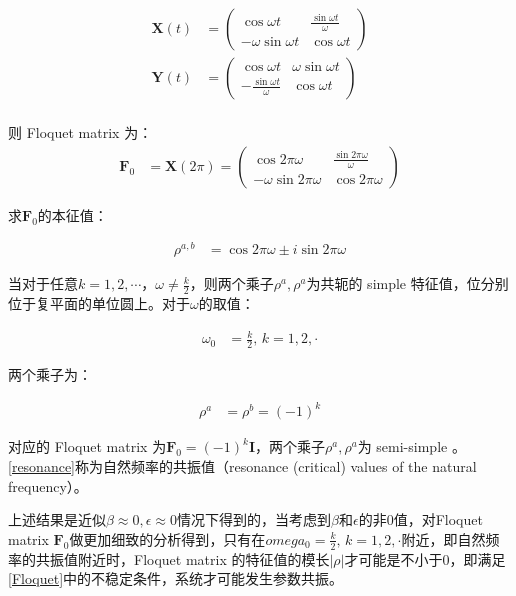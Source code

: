 \begin{align}
    \mathbf{X}(t) &= 
    \begin{pmatrix}
        \cos\omega t & \frac{\sin\omega t}{\omega} \\ 
        -\omega\sin\omega t & \cos\omega t
    \end{pmatrix} \\
    \mathbf{Y}(t) &= 
    \begin{pmatrix}
        \cos\omega t & \omega\sin\omega t \\ 
        -\frac{\sin\omega t}{\omega} & \cos\omega t
    \end{pmatrix} \\
\end{align}

则 Floquet matrix 为：
\begin{align}
    \mathbf{F}_{0} &= \mathbf{X}(2\pi) =
    \begin{pmatrix}
        \cos2\pi\omega & \frac{\sin2\pi\omega}{\omega} \\ 
        -\omega\sin2\pi\omega & \cos2\pi\omega
    \end{pmatrix}
\end{align}

求$\mathbf{F}_{0}$的本征值：

\begin{align}
    \rho^{a,b} &= \cos2\pi\omega\pm i\sin2\pi\omega
\end{align}

当对于任意$k=1,2,\cdots$，$\omega\neq\frac{k}{2}$，则两个乘子$\rho^{a},\rho^{a}$为共轭的 simple 特征值，位分别位于复平面的单位圆上。对于$\omega$的取值：

\begin{align}
    \omega_{0} &= \frac{k}{2},\,k=1,2,\cdot \label{resonance}
\end{align}

两个乘子为：

\begin{align}
    \rho^{a} &= \rho^{b} = (-1)^{k}
\end{align}

对应的 Floquet matrix 为$\mathbf{F}_{0}=(-1)^{k}\mathbf{I}$，两个乘子$\rho^{a},\rho^{a}$为 semi-simple 。\eqref{resonance}称为自然频率的共振值（resonance (critical) values of the natural frequency）。

上述结果是近似$\beta\approx0,\epsilon\approx0$情况下得到的，当考虑到$\beta$和$\epsilon$的非0值，对Floquet matrix $\mathbf{F}_{0}$做更加细致的分析得到\cite{seyranian_multiparameter_nodate}，只有在$omega_{0}=\frac{k}{2},\,k=1,2,\cdot$附近，即自然频率的共振值附近时，Floquet matrix 的特征值的模长$|\rho|$才可能是不小于0，即满足\eqref{Floquet}中的不稳定条件，系统才可能发生参数共振。

